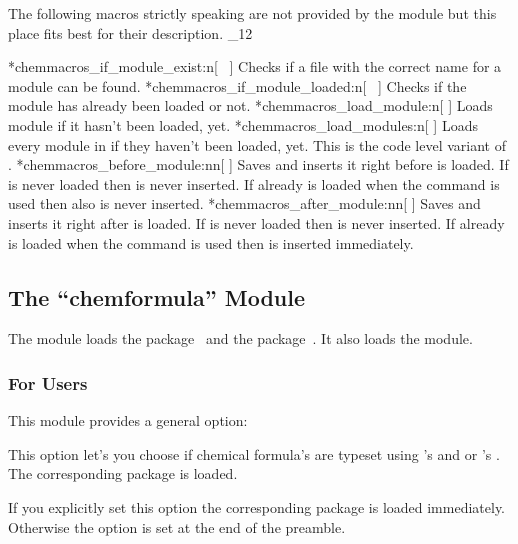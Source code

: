 \documentclass[load-preamble+]{cnltx-doc}
\makeatletter
\def\chemmodule*#1{\textquotedblleft#1\textquotedblright}%
\newcommand*\TF{\textcolor{red}{\uline{\code{\textcolor{cs}{\textit{TF}}}}}}
\renewenvironment{commands}
  {%
    \cnltx@set@catcode_{12}%
    \let\command\cnltx@command
    \cnltxlist
  }
  {\endcnltxlist}
\makeatother
\begin{document}
The following macros strictly speaking are not provided by the
 module but this place fits best for their description.
\begin{commands}
  \expandable\command*{chemmacros_if_module_exist:n}[\TF\ 
   ]
    Checks if a file with the correct name for a module  can be
    found.
  \expandable\command*{chemmacros_if_module_loaded:n}[\TF\ 
   ]
    Checks if the module  has already been loaded or not.
  \command*{chemmacros_load_module:n}[ ]
    Loads module  if it hasn't been loaded, yet.
  \command*{chemmacros_load_modules:n}[ ]
    Loads every module in  if they haven't been
    loaded, yet. This is the code level variant of .
  \command*{chemmacros_before_module:nn}[  ]
    Saves  and inserts it right before
     is loaded.  If  is never loaded then
     is never inserted.  If  already is loaded when
    the command is used then  also is never inserted.
  \command*{chemmacros_after_module:nn}[  ]
    Saves  and inserts it right after
     is loaded.  If  is never loaded then
     is never inserted.  If  already is loaded when
    the command is used then  is inserted immediately.
\end{commands}

\subsection{The \chemmodule*{chemformula} Module}\label{sec:chemformula-module}

The  module loads the 
package~\cite{pkg:chemformula} and the 
package~\cite{pkg:amstext}.  It also loads the  module.

\subsubsection{For Users}

This module provides a general option:
\begin{options}
    This option let's you choose if chemical formula's are
    typeset using 's  and  or 's
    .  The corresponding package is loaded.
\end{options}
If you explicitly set this option the corresponding package is loaded
immediately.  Otherwise the option is set at the end of the preamble.
\end{document}
